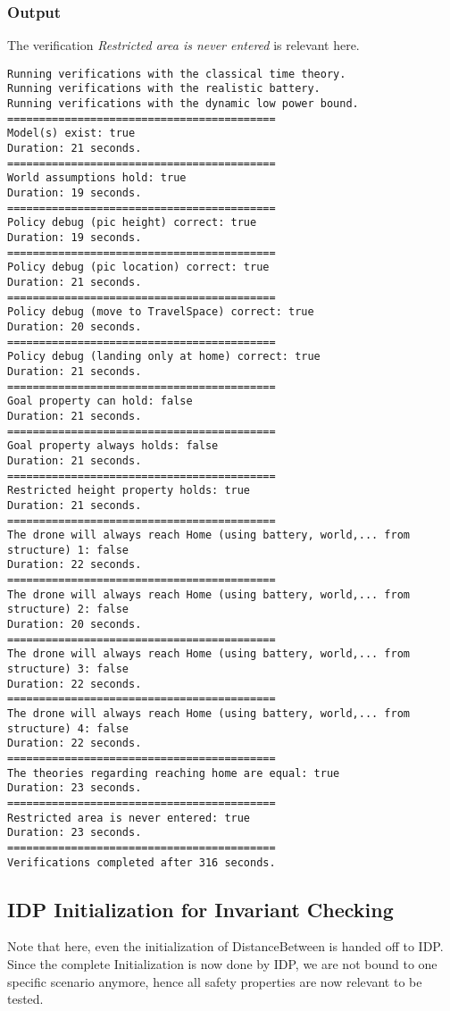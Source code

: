 \documentclass[12pt]{extarticle}
\begin{document}
\subsubsection*{Output}
The verification \textit{Restricted area is never entered} is relevant here.
\begin{lstlisting}[basicstyle=\tiny]
Running verifications with the classical time theory.
Running verifications with the realistic battery.
Running verifications with the dynamic low power bound.
==========================================
Model(s) exist: true
Duration: 21 seconds.
==========================================
World assumptions hold: true
Duration: 19 seconds.
==========================================
Policy debug (pic height) correct: true
Duration: 19 seconds.
==========================================
Policy debug (pic location) correct: true
Duration: 21 seconds.
==========================================
Policy debug (move to TravelSpace) correct: true
Duration: 20 seconds.
==========================================
Policy debug (landing only at home) correct: true
Duration: 21 seconds.
==========================================
Goal property can hold: false
Duration: 21 seconds.
==========================================
Goal property always holds: false
Duration: 21 seconds.
==========================================
Restricted height property holds: true
Duration: 21 seconds.
==========================================
The drone will always reach Home (using battery, world,... from structure) 1: false
Duration: 22 seconds.
==========================================
The drone will always reach Home (using battery, world,... from structure) 2: false
Duration: 20 seconds.
==========================================
The drone will always reach Home (using battery, world,... from structure) 3: false
Duration: 22 seconds.
==========================================
The drone will always reach Home (using battery, world,... from structure) 4: false
Duration: 22 seconds.
==========================================
The theories regarding reaching home are equal: true
Duration: 23 seconds.
==========================================
Restricted area is never entered: true
Duration: 23 seconds.
==========================================
Verifications completed after 316 seconds.
\end{lstlisting}

\subsection{IDP Initialization for Invariant Checking}
\label{app:idp-init-ic}
Note that here, even the initialization of DistanceBetween is handed off to IDP.\\
Since the complete Initialization is now done by IDP, we are not bound to one specific scenario anymore, hence all safety properties are now relevant to be tested.
\end{document}

